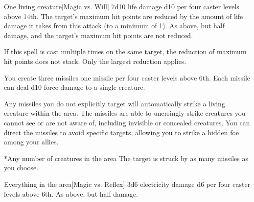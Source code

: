 \spellrng{\rngmed}
\begin{spelltarget}{One living creature}[Magic vs. Will]
    \spellsuccess 7d10 life damage \add d10 per four caster levels above 14th. The target's maximum hit points are reduced by the amount of life damage it takes from this attack (to a minimum of 1).
    \spellfailure As above, but half damage, and the target's maximum hit points are not reduced.
\end{spelltarget}
\spellnotes If this spell is cast multiple times on the same target, the reduction of maximum hit points does not stack. Only the largest reduction applies.

\cursespellnotes

\spellline
\spellspecial You create three missiles \add one missile per four caster levels above 6th. Each missile can deal d10 force damage to a single creature.

Any missiles you do not explicitly target will automatically strike a living creature within the area. The missiles are able to unerringly strike creatures you cannot see or are not aware of, including invisible or concealed creatures. You can direct the missiles to avoid specific targets, allowing you to strike a hidden foe among your allies.
\begin{spelltargets}*{Any number of creatures in the area}
    \spelleffect The target is struck by as many missiles as you choose.
\end{spelltargets}

\begin{spelltarget}{Everything in the area}[Magic vs. Reflex]
    \spellsuccess 3d6 electricity damage \add d6 per four caster levels above 6th.
    \spellfailure As above, but half damage.
\end{spelltarget}
\spellnotes \destructivespellnotes

